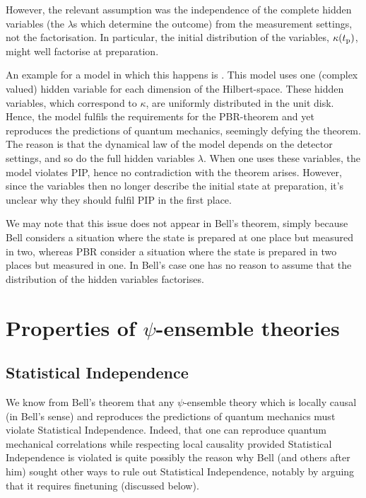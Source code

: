 \documentclass[superscriptaddress,floatfix,nofootinbib,12pt]{revtex4-2}
\begin{document}
However, the relevant assumption was the independence of the complete hidden variables (the $\lambda$s which determine the outcome) from the measurement settings, not the factorisation. In particular, the initial distribution of the variables, $\kappa(t_{\rm p})$, might well factorise at preparation. 

An example for a model in which this happens is \cite{Donadi2020SuperdetToy}. This model uses one (complex valued) hidden variable for each dimension of the Hilbert-space. These hidden variables, which correspond to $\kappa$, are uniformly distributed in the unit disk.  Hence, the model fulfils the requirements for the {\sc PBR}-theorem and yet reproduces the predictions of quantum mechanics, seemingly defying the theorem. The reason is that the dynamical law of the model depends on the detector settings, and so do the full hidden variables $\lambda$. When one uses these variables, the model violates {\sc PIP}, hence no contradiction with the theorem arises. However, since the variables then no longer describe the initial state at preparation, it's unclear why they should fulfil {\sc PIP} in the first place.

We may note that this issue does not appear in Bell's theorem, simply because Bell considers a situation where the state is prepared at one place but measured in two, whereas {\sc PBR} consider a situation where the state is prepared in two places but measured in one. In Bell's case one has no reason to assume that the distribution of the hidden variables factorises. 


\section{Properties of \texorpdfstring{$\psi$}{psi}-ensemble theories}
\label{SI}

\subsection{Statistical Independence}

We know from Bell's theorem that any $\psi$-ensemble theory which is locally causal (in Bell's sense) and reproduces the predictions of quantum mechanics must violate Statistical Independence. Indeed, that one can reproduce quantum mechanical correlations while respecting local causality provided Statistical Independence is violated is quite possibly the reason why Bell (and others after him) sought other ways to rule out Statistical Independence, notably by arguing that it requires finetuning (discussed below). 
\end{document}
